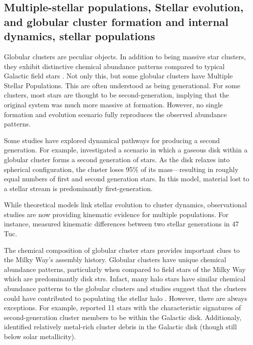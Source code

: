     \subsection{Multiple-stellar populations, Stellar evolution, and globular cluster formation and internal dynamics, stellar populations}
        Globular clusters are peculiar objects. In addition to being massive star clusters, they exhibit distinctive chemical abundance patterns compared to typical Galactic field stars \citep{2012A&ARv..20...50G,2018ARA&A..56...83B,2019A&ARv..27....8G}. Not only this, but some globular clusters have Multiple Stellar Populations. This are often understood as being generational. For some clusters, most stars are thought to be second-generation, implying that the original system was much more massive at formation. However, no single formation and evolution scenario fully reproduces the observed abundance patterns.

        Some studies have explored dynamical pathways for producing a second generation. For example, \citet{2024A&A...681A..45L} investigated a scenario in which a gaseous disk within a globular cluster forms a second generation of stars. As the disk relaxes into spherical configuration, the cluster loses 95\% of its mass---resulting in roughly equal numbers of first and second generation stars. In this model, material lost to a stellar stream is predominantly first-generation.

        While theoretical models link stellar evolution to cluster dynamics, observational studies are now providing kinematic evidence for multiple populations. For instance, \citet{2025MNRAS.537.2342C} measured kinematic differences between two stellar generations in 47 Tuc.        

        The chemical composition of globular cluster stars provides important clues to the Milky Way's assembly history. Globular clusters have unique chemical abundance patterns, particularly when compared to field stars of the Milky Way which are predominantly disk strs.  Infact, many halo stars have similar chemical abundance patterns to the globular clusters and studies suggest that the clusters could have contributed to populating the stellar halo \citep{2016ApJ...825..146M,2017MNRAS.465..501S}. However, there are always exceptions. For example, \citet{2017ApJ...846L...2F} reported 11 stars with the characteristic signatures of second-generation cluster members to be within the Galactic disk. Additionaly, \citet{2021ApJ...918L..37F} identified relatively metal-rich cluster debris in the Galactic disk (though still below solar metallicity). 

